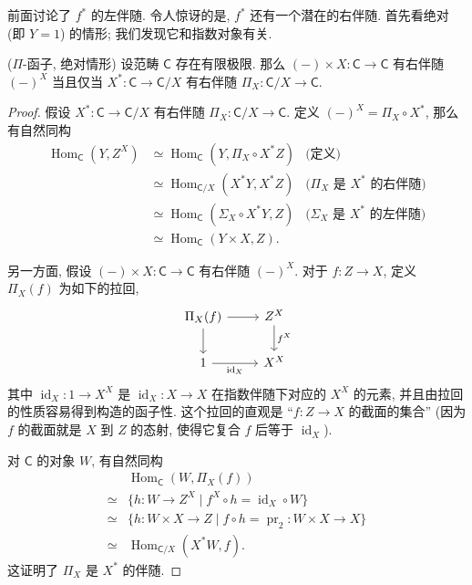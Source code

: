 前面讨论了 $f^*$ 的左伴随. 令人惊讶的是, $f^*$ 还有一个潜在的右伴随. 首先看绝对 (即 $Y=1$) 的情形; 我们发现它和指数对象有关.

\begin{propdef}
    {($\Pi$-函子, 绝对情形)}
    设范畴 $\mathsf C$ 存在有限极限.
    那么 $(-)\times X \colon \mathsf C \to \mathsf C$ 有右伴随 $(-)^X$ 当且仅当
    $X^* \colon \mathsf C \to \mathsf C/X$ 有右伴随 $\Pi_X \colon \mathsf C/X \to \mathsf C$.
\end{propdef}

\begin{proof}
    假设 $X^* \colon \mathsf C \to \mathsf C/X$ 有右伴随 $\Pi_X \colon \mathsf C/X \to \mathsf C$. 定义 $(-)^X = \Pi_X \circ X^*$, 那么有自然同构
    \begin{align*}
        \operatorname{Hom}_{\mathsf C} (Y,Z^X)
        &\simeq\operatorname{Hom}_{\mathsf C} (Y,\Pi_X\circ X^*Z)&\text{(定义)}\\
        &\simeq\operatorname{Hom}_{\mathsf C/X} (X^*Y,X^*Z)&\text{($\Pi_X$ 是 $X^*$ 的右伴随)}\\
        &\simeq\operatorname{Hom}_{\mathsf C} (\Sigma_X\circ X^*Y,Z)&\text{($\Sigma_X$ 是 $X^*$ 的左伴随)}\\
        &\simeq\operatorname{Hom}_{\mathsf C} (Y\times X,Z).
    \end{align*}

    另一方面, 假设 $(-)\times X \colon \mathsf C \to \mathsf C$ 有右伴随 $(-)^X$.
    对于 $f\colon Z \to X$, 定义 $\Pi_X(f)$ 为如下的拉回,
    \[\begin{tikzcd}[ampersand replacement=\&]
    	{\Pi_X(f)} \& {Z^X} \\
    	1 \& {X^X}
    	\arrow["{\operatorname{id}_X}"', from=2-1, to=2-2]
    	\arrow[from=1-1, to=2-1]
    	\arrow[from=1-1, to=1-2]
    	\arrow["{f^X}", from=1-2, to=2-2]
    \end{tikzcd}\]
    其中 $\operatorname{id}_X \colon 1 \to X^X$
    是 $\operatorname{id}_X \colon X \to X$
    在指数伴随下对应的 $X^X$ 的元素,
    并且由拉回的性质容易得到构造的函子性.
    这个拉回的直观是 ``$f \colon Z \to X$ 的截面的集合'' (因为 $f$ 的截面就是 $X$ 到 $Z$ 的态射, 使得它复合 $f$ 后等于 $\operatorname{id}_X$).
    
    对 $\mathsf C$ 的对象 $W$, 有自然同构
    \begin{align*}
        &\operatorname{Hom}_{\mathsf C}(W,\Pi_X(f))
        \\\simeq&
        \big\{
        h\colon W\to Z^X \mid f^X \circ h=\operatorname{id}_X\circ W
        \big\}
        \\\simeq&
        \big\{
        h\colon W\times X \to Z \mid f \circ h = \operatorname{pr}_2 \colon W\times X \to X
        \big\}
        \\\simeq&
        \operatorname{Hom}_{\mathsf C/X}
        (X^*W,f).
    \end{align*}
    这证明了 $\Pi_X$ 是 $X^*$ 的伴随.
\end{proof}

